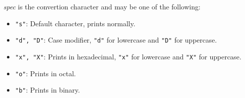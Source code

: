 \emph{spec} is the convertion character and may be one of the following:
\begin{itemize}
\item \verb&"s"&: Default character, prints normally.
\item \verb&"d", "D"&: Case modifier, \verb&"d"& for lowercase and \verb&"D"& for uppercase.
\item \verb&"x", "X"&: Prints in hexadecimal, \verb&"x"& for lowercase and \verb&"X"& for uppercase.
\item \verb&"o"&: Prints in octal.
\item \verb&"b"&: Prints in binary.
\end{itemize}
